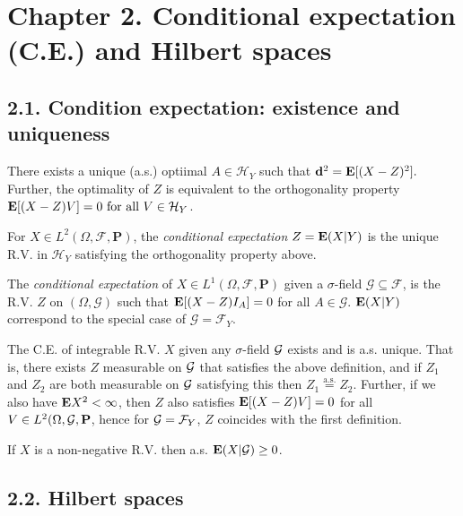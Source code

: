 \section*{Chapter 2. Conditional expectation (C.E.) and Hilbert spaces}
\subsection*{2.1. Condition expectation: existence and uniqueness}
\begin{proposition*}
There exists a unique (a.s.) optiimal $A \in \mathcal H_Y$ such that $\mathbf d^2 = \mathbf{E}[(X-Z)^2].$ Further, the optimality of $Z$ is equivalent to the orthogonality property $\mathbf{E}[(X-Z)V] = 0 \text{ for all } V \in \mathcal H_Y$.
\end{proposition*}

\begin{definition*}
For $X \in L^2(\Omega, \mathcal F, \mathbf P)$, the \emph{conditional expectation} $Z = \mathbf{E}(X|Y)$ is the unique R.V. in $\mathcal H_Y$ satisfying the orthogonality property above.
\end{definition*}

\begin{definition*}
The \emph{conditional expectation} of $X \in L^1(\Omega, \mathcal F, \mathbf P)$ given a $\sigma$-field $\mathcal G \subseteq \mathcal F$, is the R.V. $Z$ on $(\Omega, \mathcal G)$ such that $\mathbf{E}[(X-Z)I_A]=0$ for all $A \in \mathcal G$. $\mathbf{E}(X|Y)$ correspond to the special case of $\mathcal G = \mathcal F_Y$.
\end{definition*}

\begin{theorem*}
The C.E. of integrable R.V. $X$ given any $\sigma$-field $\mathcal{G}$ exists and is a.s. unique. That is, there exists $Z$ measurable on $\mathcal{G}$ that satisfies the above definition, and if $Z_1$ and $Z_2$ are both measurable on $\mathcal{G}$ satisfying this then $Z_1 \overset{\text{a.s.}}{=} Z_2$. Further, if we also have $\mathbf{E} X^2 < \infty$, then $Z$ also satisfies $\mathbf{E}[(X-Z)V]=0$ for all $V \in L^2(\Omega, \mathcal{G}, \mathbf P$, hence for $\mathcal{G} = \mathcal F_Y$, $Z$ coincides with the first definition.
\end{theorem*}

\begin{proposition*}
If $X$ is a non-negative R.V. then a.s. $\mathbf{E}(X|\mathcal{G})\geq0$.
\end{proposition*}

\subsection*{2.2. Hilbert spaces}

